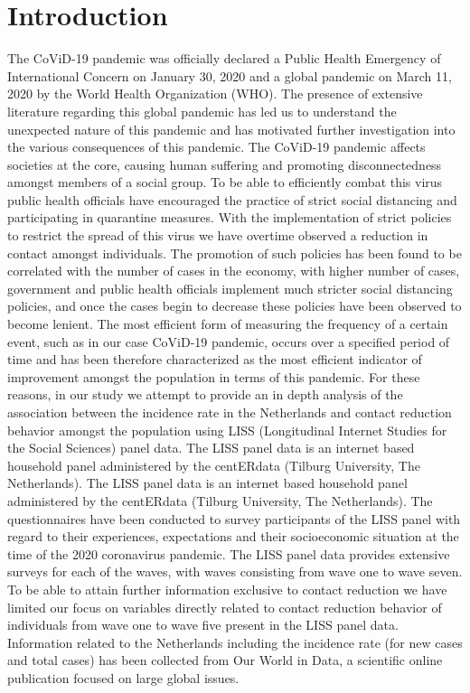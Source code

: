 \documentclass[12pt, a4paper, oneside]{scrartcl}
\title{}
\begin{document}
\maketitle
\section{Introduction}

The CoViD-19 pandemic was officially declared a Public Health Emergency of International Concern on January 30, 2020 and a global pandemic on March 11, 2020 by the World Health Organization (WHO). The presence of extensive literature regarding this global pandemic has led us to understand the unexpected nature of this pandemic and has motivated further investigation into the various consequences of this pandemic. The  CoViD-19 pandemic affects societies at the core, causing human suffering and promoting disconnectedness amongst members of a social group. To be able to efficiently combat this virus public health officials have encouraged the practice of strict social distancing and participating in quarantine measures. With the implementation of strict policies to restrict the spread of this virus we have overtime observed a reduction in contact amongst individuals. The promotion of such policies has been found to be correlated with the number of cases in the economy, with higher number of cases, government and public health officials implement much stricter social distancing policies, and once the cases begin to decrease these policies have been observed to become lenient. The most efficient form of measuring the frequency of a certain event, such as in our case CoViD-19 pandemic, occurs over a specified period of time and has been therefore characterized as the most efficient indicator of improvement amongst the population in terms of this pandemic. For these reasons, in our study we attempt to provide an in depth analysis of  the association between the incidence rate in the Netherlands and contact reduction behavior amongst the population using LISS (Longitudinal Internet Studies for the Social Sciences) panel data. The LISS panel data is an internet based household panel administered by the centERdata (Tilburg University, The Netherlands). The LISS panel data is an internet based household panel administered by the centERdata (Tilburg University, The Netherlands).  The questionnaires have been conducted to survey participants of the LISS panel with regard to their experiences, expectations and their socioeconomic situation at the time of the 2020 coronavirus pandemic. The LISS panel data provides extensive surveys for each of the waves, with waves consisting from wave one to wave seven.   To be able to attain further information exclusive to contact reduction we have limited our focus on variables directly related to contact reduction behavior of individuals from wave one to wave five present in the LISS panel data.  Information related to the Netherlands including the incidence rate (for new cases and total cases) has been collected from Our World in Data, a scientific online publication focused on large global issues. 
\end{document}
